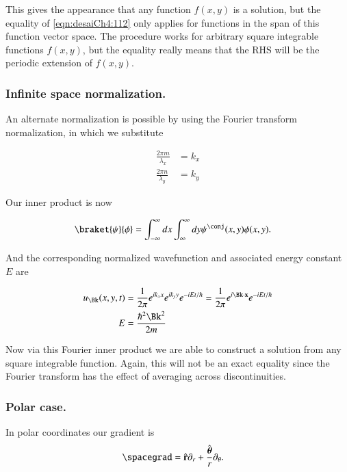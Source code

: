 This gives the appearance that any function $f(x,y)$ is a solution, but the equality of \ref{eqn:desaiCh4:112} only applies for functions in the span of this function vector space.  The procedure works for arbitrary square integrable functions $f(x,y)$, but the equality really means that the RHS will be the periodic extension of $f(x,y)$.

\subsubsection{Infinite space normalization.}

An alternate normalization is possible by using the Fourier transform normalization, in which we substitute 

\begin{align}\label{eqn:desaiCh4:114}
\frac{2 \pi m }{\lambda_x} &= k_x \\
\frac{2 \pi n }{\lambda_y} &= k_y 
\end{align}

Our inner product is now

\begin{align}\label{eqn:desaiCh4:115}
\braket{\psi}{\phi} &= 
\int_{-\infty}^{\infty} dx
\int_{\infty}^{\infty} dy \psi^\conj(x,y) \phi(x,y).
\end{align}

And the corresponding normalized wavefunction and associated energy constant $E$ are

\begin{align}\label{eqn:desaiCh4:116}
u_{\Bk}(x,y,t) 
&= \inv{2\pi}
e^{i k_x x}
e^{i k_y y}
e^{-iE t/\hbar} 
= \inv{2\pi}
e^{i \Bk \cdot \Bx}
e^{-iE t/\hbar} \\
E &= \frac{\hbar^2 \Bk^2 }{2m}
\end{align}

Now via this Fourier inner product we are able to construct a solution from any square integrable function.  Again, this will not be
an exact equality since the Fourier transform has the effect of averaging across discontinuities.

\subsubsection{Polar case.}

In polar coordinates our gradient is
\begin{align}\label{eqn:desaiCh4:140}
\spacegrad &= \rcap \partial_r + \frac{\thetacap}{r} \partial_\theta.
\end{align}

